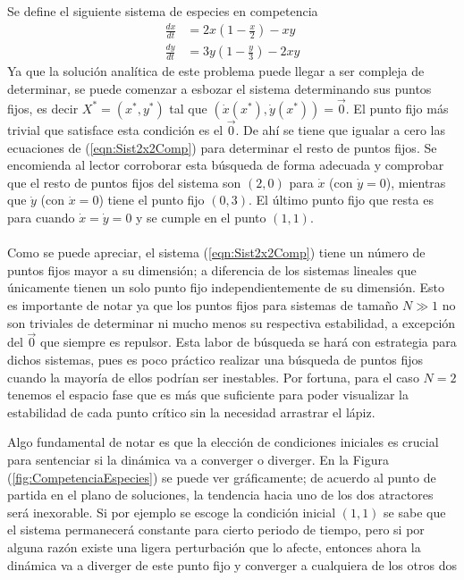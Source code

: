 \begin{ejemplo}\label{eg:2x2}
	Se define el siguiente sistema de especies en competencia
	\begin{equation}\label{eqn:Sist2x2Comp}
		\begin{split}
			\frac{dx}{dt}&=2x\left(1-\frac{x}{2}\right)-xy\\
			\frac{dy}{dt}&=3y\left(1-\frac{y}{3}\right)-2xy
		\end{split}
	\end{equation}
	Ya que la solución analítica de este problema puede llegar a ser compleja de determinar, se puede comenzar a esbozar el sistema determinando sus puntos fijos, es decir $X^*=(x^*,y^*)$ tal que $(\dot{x}(x^*),\dot{y}(x^*))=\vec{0}$. El punto fijo más trivial que satisface esta condición es el $\vec{0}$. De ahí se tiene que igualar a cero las ecuaciones de (\ref{eqn:Sist2x2Comp}) para determinar el resto de puntos fijos. Se encomienda al lector corroborar esta búsqueda de forma adecuada y comprobar que el resto de puntos fijos del sistema son $(2,0)$ para $\dot{x}$ (con $\dot{y}=0$), mientras que $\dot{y}$ (con $\dot{x}=0$) tiene el punto fijo $(0,3)$. El último punto fijo que resta es para cuando $\dot{x}=\dot{y}=0$ y se cumple en el punto $(1,1)$.\\
	\\
	Como se puede apreciar, el sistema (\ref{eqn:Sist2x2Comp}) tiene un número de puntos fijos mayor a su dimensión; a diferencia de los sistemas lineales que únicamente tienen un solo punto fijo independientemente de su dimensión. Esto es importante de notar ya que los puntos fijos para sistemas de tamaño $N\gg 1$ no son triviales de determinar ni mucho menos su respectiva estabilidad, a excepción del $\vec{0}$ que siempre es repulsor. Esta labor de búsqueda se hará con estrategia para dichos sistemas, pues es poco práctico realizar una búsqueda de puntos fijos cuando la mayoría de ellos podrían ser inestables. Por fortuna, para el caso $N=2$ tenemos el espacio fase que es más que suficiente para poder visualizar la estabilidad de cada punto crítico sin la necesidad arrastrar el lápiz.
\end{ejemplo}
Algo fundamental de notar es que la elección de condiciones iniciales es crucial para sentenciar si la dinámica va a converger o diverger. En la Figura (\ref{fig:CompetenciaEspecies}) se puede ver gráficamente; de acuerdo al punto de partida en el plano de soluciones, la tendencia hacia uno de los dos atractores será inexorable. Si por ejemplo se escoge la condición inicial $(1,1)$ se sabe que el sistema permanecerá constante para cierto periodo de tiempo, pero si por alguna razón existe una ligera perturbación que lo afecte, entonces ahora la dinámica va a diverger de este punto fijo y converger a cualquiera de los otros dos 
